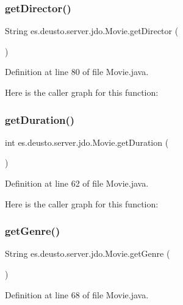 \subsubsection{\texorpdfstring{getDirector()}{getDirector()}}
{\footnotesize\ttfamily String es.\+deusto.\+server.\+jdo.\+Movie.\+get\+Director (\begin{DoxyParamCaption}{ }\end{DoxyParamCaption})}



Definition at line 80 of file Movie.\+java.

Here is the caller graph for this function\+:
\mbox{\label{classes_1_1deusto_1_1server_1_1jdo_1_1_movie_a3c056812ade3ddfa59723e5181c90206}} 
\subsubsection{\texorpdfstring{getDuration()}{getDuration()}}
{\footnotesize\ttfamily int es.\+deusto.\+server.\+jdo.\+Movie.\+get\+Duration (\begin{DoxyParamCaption}{ }\end{DoxyParamCaption})}



Definition at line 62 of file Movie.\+java.

Here is the caller graph for this function\+:
\mbox{\label{classes_1_1deusto_1_1server_1_1jdo_1_1_movie_a5505376d4003bcfa7603fc1a707e2528}} 
\subsubsection{\texorpdfstring{getGenre()}{getGenre()}}
{\footnotesize\ttfamily String es.\+deusto.\+server.\+jdo.\+Movie.\+get\+Genre (\begin{DoxyParamCaption}{ }\end{DoxyParamCaption})}



Definition at line 68 of file Movie.\+java.

